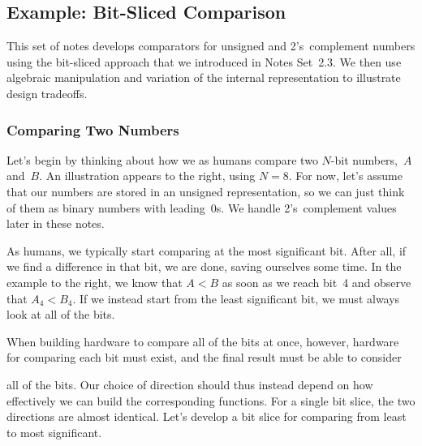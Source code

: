 \classtitle

\subsection{Example: Bit-Sliced Comparison}

This set of notes develops comparators for unsigned and 2's~complement 
numbers using the bit-sliced approach that we introduced in Notes Set~2.3.  
We then use algebraic manipulation and variation of the internal 
representation to illustrate design tradeoffs.\\


\subsubsection{Comparing Two Numbers}

\begin{minipage}{4.7in}
Let's begin by thinking about how we as humans compare two \mbox{$N$-bit}
numbers,~$A$ and~$B$.
%
An illustration appears to the right, using $N=8$.
%
For now, let's assume that our numbers are stored in an unsigned 
representation, so we can just think of them as binary numbers
with leading~0s.
%
We handle 2's~complement values later in these notes.\mpline

As humans, we typically start comparing at the most significant bit.
After all, if we find a difference in that bit, we are done, saving
ourselves some time.  In the example to the right, we know that $A<B$ 
as soon as we reach bit~4 and observe that $A_4<B_4$.
%
If we instead start from the least significant bit,
we must always look at all of the bits.\mpline

When building hardware to compare all of the bits at once, however,
hardware for comparing each bit must exist, and the final result 
must be able to consider\linebreak
\end{minipage}\hspace{.25in}%
\begin{minipage}{1.55in}
\vspace{12pt}
\end{minipage}\mpdone

all of the bits.  Our choice of direction should thus instead depend on 
how effectively we can build the 
corresponding functions.  For a single bit slice, the two directions 
are almost identical.  Let's develop a bit slice for
comparing from least to most significant.\\

